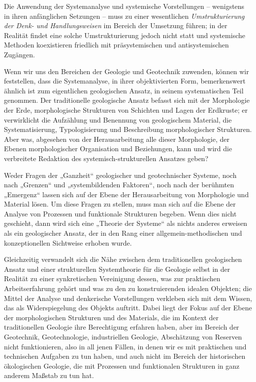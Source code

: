 \documentclass[11pt,a4paper]{article}
\begin{document}
Die Anwendung der Systemanalyse und systemische Vorstellungen -- wenigstens in
ihren anfänglichen Setzungen -- muss zu einer wesentlichen
\emph{Umstrukturierung der Denk- und Handlungsweisen} im Bereich der Umsetzung
führen; in der Realität findet eine solche Umstrukturierung jedoch nicht statt
und systemische Methoden koexistieren friedlich mit präsystemischen und
antisystemischen Zugängen.

Wenn wir uns den Bereichen der Geologie und Geotechnik zuwenden, können wir
feststellen, dass die Systemanalyse, in ihrer objektivierten Form,
bemerkenswert ähnlich ist zum eigentlichen geologischen Ansatz, in seinem
systematischen Teil genommen. Der traditionelle geologische Ansatz befasst
sich mit der Morphologie der Erde, morphologische Strukturen von Schichten und
Lagen der Erdkruste; er verwirklicht die Aufzählung und Benennung von
geologischem Material, die Systematisierung, Typologisierung und Beschreibung
morphologischer Strukturen. Aber was, abgesehen von der Herausarbeitung alle
dieser Morphologie, der Ebenen morphologischer Organisation und Beziehungen,
kann und wird die verbreitete Redaktion des systemisch-strukturellen Ansatzes
geben?

Weder Fragen der „Ganzheit“ geologischer und geotechnischer Systeme, noch nach
„Grenzen“ und „systembildenden Faktoren“, noch nach der berühmten „Emergenz“
lassen sich auf der Ebene der Herausarbeitung von Morphologie und Material
lösen. Um diese Fragen zu stellen, muss man sich auf die Ebene der Analyse von
Prozessen und funktionale Strukturen begeben. Wenn dies nicht geschieht, dann
wird sich eine „Theorie der Systeme“ als nichts anderes erweisen als ein
geologischer Ansatz, der in den Rang einer allgemein-methodischen und
konzeptionellen Sichtweise erhoben wurde.

Gleichzeitig verwandelt sich die Nähe zwischen dem traditionellen geologischen
Ansatz und einer strukturellen Systemtheorie für die Geologie selbst in der
Realität zu einer synkretischen Vereinigung dessen, was zur praktischen
Arbeitserfahrung gehört und was zu den zu konstruierenden idealen Objekten;
die Mittel der Analyse und denkerische Vorstellungen verkleben sich mit dem
Wissen, das als Widerspiegelung des Objekts auftritt. Dabei liegt der Fokus
auf der Ebene der morphologischen Strukturen und des Materials, die im Kontext
der traditionellen Geologie ihre Berechtigung erfahren haben, aber im Bereich
der Geotechnik, Geotechnologie, industriellen Geologie, Abschätzung von
Reserven nicht funktionieren, also in all jenen Fällen, in denen wir es mit
praktischen und technischen Aufgaben zu tun haben, und auch nicht im Bereich
der historischen ökologischen Geologie, die mit Prozessen und funktionalen
Strukturen in ganz anderem Maßstab zu tun hat.
\end{document}
